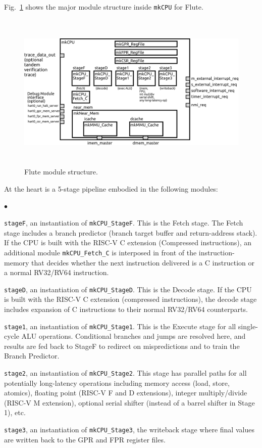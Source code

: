 \documentclass[11pt]{book}
\newenvironment{tightlist}%
{\begin{list}{$\bullet$}{%
    \setlength{\topsep}{0in}
    \setlength{\partopsep}{0in}
    \setlength{\itemsep}{0in}
    \setlength{\parsep}{0in}
    \setlength{\leftmargin}{1.5em}
    \setlength{\rightmargin}{0in}
    \setlength{\itemindent}{0in}
}
}%
{\end{list}
}
\newcommand{\cf}{\footnotesize\tt}
\begin{document}
Fig.~\ref{Fig_500_mkCPU_Flute} shows the major module structure
inside {\cf mkCPU} for Flute.
\begin{figure}[htbp]
  \centerline{\includegraphics[height=3in,angle=0]{Figures/Fig_500_mkCPU_Flute.png}}
  \caption{\label{Fig_500_mkCPU_Flute}Flute module structure.}
\end{figure}
At the heart is a 5-stage pipeline embodied in the following modules:
\begin{tightlist}

\item {\cf stageF}, an instantiation of {\cf mkCPU\_StageF}. This is
the Fetch stage.  The Fetch stage includes a branch predictor (branch
target buffer and return-address stack).  If the CPU is built with the
RISC-V C extension (Compressed instructions), an additional module
{\cf mkCPU\_Fetch\_C} is interposed in front of the instruction-memory
that decides whether the next instruction delivered is a C instruction
or a normal RV32/RV64 instruction.

\item {\cf stageD}, an instantiation of {\cf mkCPU\_StageD}. This is
the Decode stage.  If the CPU is built with the RISC-V C extension
(compressed instructions), the decode stage includes expansion of C
instructions to their normal RV32/RV64 counterparts.

\item {\cf stage1}, an instantiation of {\cf mkCPU\_Stage1}. This is
the Execute stage for all single-cycle ALU operations.  Conditional
branches and jumps are resolved here, and results are fed back to
StageF to redirect on mispredictions and to train the Branch
Predictor.

\item {\cf stage2}, an instantiation of {\cf mkCPU\_Stage2}. This
stage has parallel paths for all potentially long-latency operations
including memory access (load, store, atomics), floating point (RISC-V
F and D extensions), integer multiply/divide (RISC-V M extension),
optional serial shifter (instead of a barrel shifter in Stage 1), etc.

\item {\cf stage3}, an instantiation of {\cf mkCPU\_Stage3}, the
writeback stage where final values are written back to the GPR and FPR
register files.

\end{tightlist}
\end{document}
